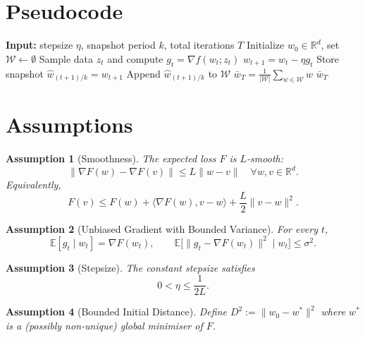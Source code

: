 \documentclass{article}
\newtheorem{assumption}{Assumption}
\begin{document}
\section*{Pseudocode}
\begin{algorithm}[H]
\caption{SWA‑k}
\begin{algorithmic}[1]
\STATE \textbf{Input:} stepsize $\eta$, snapshot period $k$, total iterations $T$
\STATE Initialize $w_0\in\mathbb{R}^d$, set $\mathcal{W}\leftarrow\emptyset$
    \STATE Sample data $z_t$ and compute $g_t=\nabla f(w_t;z_t)$
    \STATE $w_{t+1}=w_t-\eta g_t$ \hfill{}
        \STATE Store snapshot $\widehat w_{(t+1)/k}=w_{t+1}$ \hfill{}
        \STATE Append $\widehat w_{(t+1)/k}$ to $\mathcal{W}$
    \ENDIF
\ENDFOR
\STATE $\displaystyle \bar w_T=\frac{1}{|\mathcal{W}|}\sum_{w\in\mathcal{W}} w$ \hfill{}
\RETURN $\bar w_T$
\end{algorithmic}
\end{algorithm}

\section*{Assumptions}
\begin{assumption}[Smoothness]\label{ass:smooth}
The expected loss $F$ is $L$‑smooth:
\[
\|\nabla F(w)-\nabla F(v)\|\le L\|w-v\|\quad\forall w,v\in\mathbb{R}^d .
\tag{A1}
\]
Equivalently,
\[
F(v)\le F(w)+\langle\nabla F(w),v-w\rangle+\frac{L}{2}\|v-w\|^{2}.
\tag{A1'}
\]
\end{assumption}

\begin{assumption}[Unbiased Gradient with Bounded Variance]\label{ass:unbiased}
For every $t$,
\[
\mathbb{E}[g_t\mid w_t]=\nabla F(w_t),\qquad 
\mathbb{E}\big[\|g_t-\nabla F(w_t)\|^{2}\mid w_t\big]\le\sigma^{2}.
\tag{A2}
\]
\end{assumption}

\begin{assumption}[Stepsize]\label{ass:stepsize}
The constant stepsize satisfies 
\[
0<\eta\le\frac{1}{2L}.
\tag{A3}
\]
\end{assumption}

\begin{assumption}[Bounded Initial Distance]\label{ass:init}
Define $D^{2}:=\|w_0-w^{*}\|^{2}$ where $w^{*}$ is a (possibly non‑unique) global minimiser of $F$.
\]
\end{assumption}
\end{document}
